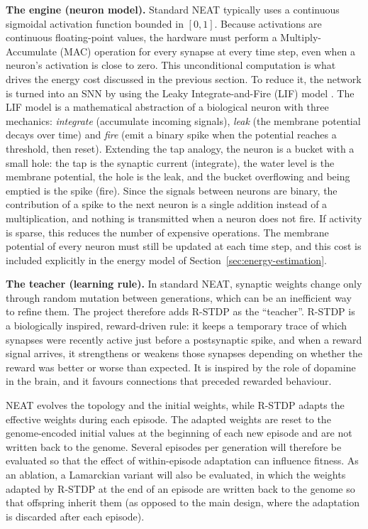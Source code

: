 \textbf{The engine (neuron model).} Standard NEAT typically uses a continuous sigmoidal activation function bounded in $[0,1]$. Because activations are continuous floating-point values, the hardware must perform a Multiply-Accumulate (MAC) operation for every synapse at every time step, even when a neuron's activation is close to zero. This unconditional computation is what drives the energy cost discussed in the previous section. To reduce it, the network is turned into an SNN by using the Leaky Integrate-and-Fire (LIF) model \cite{gerstner2014}. The LIF model is a mathematical abstraction of a biological neuron with three mechanics: \emph{integrate} (accumulate incoming signals), \emph{leak} (the membrane potential decays over time) and \emph{fire} (emit a binary spike when the potential reaches a threshold, then reset). Extending the tap analogy, the neuron is a bucket with a small hole: the tap is the synaptic current (integrate), the water level is the membrane potential, the hole is the leak, and the bucket overflowing and being emptied is the spike (fire). Since the signals between neurons are binary, the contribution of a spike to the next neuron is a single addition instead of a multiplication, and nothing is transmitted when a neuron does not fire. If activity is sparse, this reduces the number of expensive operations. The membrane potential of every neuron must still be updated at each time step, and this cost is included explicitly in the energy model of Section~\ref{sec:energy-estimation}.

\textbf{The teacher (learning rule).} In standard NEAT, synaptic weights change only through random mutation between generations, which can be an inefficient way to refine them. The project therefore adds R-STDP as the ``teacher''. R-STDP is a biologically inspired, reward-driven rule: it keeps a temporary trace of which synapses were recently active just before a postsynaptic spike, and when a reward signal arrives, it strengthens or weakens those synapses depending on whether the reward was better or worse than expected. It is inspired by the role of dopamine in the brain, and it favours connections that preceded rewarded behaviour.

NEAT evolves the topology and the initial weights, while R-STDP adapts the effective weights during each episode. The adapted weights are reset to the genome-encoded initial values at the beginning of each new episode and are not written back to the genome. Several episodes per generation will therefore be evaluated so that the effect of within-episode adaptation can influence fitness. As an ablation, a Lamarckian variant will also be evaluated, in which the weights adapted by R-STDP at the end of an episode are written back to the genome so that offspring inherit them (as opposed to the main design, where the adaptation is discarded after each episode).